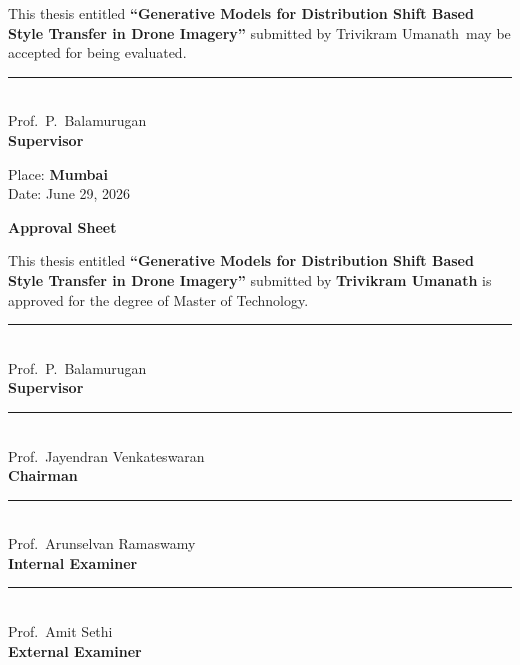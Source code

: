 \documentclass[12pt,oneside]{book}
\newcommand{\name}{Trivikram Umanath}
\newcommand{\mtptitle}{Generative Models for Distribution Shift Based Style Transfer in Drone Imagery}
\begin{document}
\noindent This thesis entitled \textbf{``\mtptitle''} submitted by \name\ may be accepted for being evaluated.

\vspace{1.6cm}
\begin{flushright}
\rule{6cm}{0.4pt}\\[0.25cm]
Prof.\ P.\ Balamurugan\\
\textbf{Supervisor}
\end{flushright}

\vspace{1.6cm}
\noindent Place: \textbf{Mumbai}\\
Date: June 29, 2026


\clearpage
\thispagestyle{empty}
\begin{center}
{\Large\bfseries Approval Sheet}
\end{center}
\vspace{0.8cm}

\noindent This thesis entitled \textbf{``\mtptitle''} submitted by \textbf{\name} is approved for the degree of Master of Technology.

\vspace{1.4cm}
\begin{flushright}
\rule{6cm}{0.4pt}\\[0.25cm]
Prof.\ P.\ Balamurugan\\
\textbf{Supervisor}
\end{flushright}

\vspace{1.2cm}
\begin{flushright}
\rule{6cm}{0.4pt}\\[0.25cm]
Prof.\ Jayendran Venkateswaran\\
\textbf{Chairman}
\end{flushright}

\vspace{1.2cm}
\begin{flushright}
\rule{6cm}{0.4pt}\\[0.25cm]
Prof.\ Arunselvan Ramaswamy\\
\textbf{Internal Examiner}
\end{flushright}

\vspace{1.2cm}
\begin{flushright}
\rule{6cm}{0.4pt}\\[0.25cm]
Prof.\ Amit Sethi\\
\textbf{External Examiner}
\end{flushright}
\end{document}
